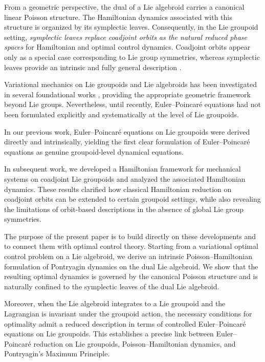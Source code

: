 \documentclass{article}
\begin{document}
From a geometric perspective, the dual of a Lie algebroid carries a canonical linear Poisson structure. 
The Hamiltonian dynamics associated with this structure is organized by its symplectic leaves. 
Consequently, in the Lie groupoid setting, \emph{symplectic leaves replace coadjoint orbits as the natural reduced phase spaces} for Hamiltonian and optimal control dynamics. 
Coadjoint orbits appear only as a special case corresponding to Lie group symmetries, whereas symplectic leaves provide an intrinsic and fully general description \cite{MarsdenRatiu1999, CendraMarsdenRatiu2001, HolmMarsdenRatiu, HaghighatdoostEPGroupoids, Martinez2001, Weinstein1983}.

Variational mechanics on Lie groupoids and Lie algebroids has been investigated in several foundational works \cite{Weinstein1996, Bloch,CendraMarsdenRatiu2001, HaghighatdoostEPGroupoids, HolmMarsdenRatiu, Landsman, Martinez2001}, providing the appropriate geometric framework beyond Lie groups. 
Nevertheless, until recently, Euler--Poincar\'e equations had not been formulated explicitly and systematically at the level of Lie groupoids. 

In our previous work, Euler--Poincar\'e equations on Lie groupoids were derived directly and intrinsically, yielding the first clear formulation of Euler--Poincar\'e equations as genuine groupoid-level dynamical equations.

In subsequent work, we developed a Hamiltonian framework for mechanical systems on coadjoint Lie groupoids and analyzed the associated Hamiltonian dynamics. 
These results clarified how classical Hamiltonian reduction on coadjoint orbits can be extended to certain groupoid settings, while also revealing the limitations of orbit-based descriptions in the absence of global Lie group symmetries.

The purpose of the present paper is to build directly on these developments and to connect them with optimal control theory. 
Starting from a variational optimal control problem on a Lie algebroid, we derive an intrinsic Poisson--Hamiltonian formulation of Pontryagin dynamics on the dual Lie algebroid. 
We show that the resulting optimal dynamics is governed by the canonical Poisson structure and is naturally confined to the symplectic leaves of the dual Lie algebroid.

Moreover, when the Lie algebroid integrates to a Lie groupoid and the Lagrangian is invariant under the groupoid action, the necessary conditions for optimality admit a reduced description in terms of controlled Euler--Poincar\'e equations on Lie groupoids. 
This establishes a precise link between Euler--Poincar\'e reduction on Lie groupoids, Poisson--Hamiltonian dynamics, and Pontryagin's Maximum Principle.
\end{document}
